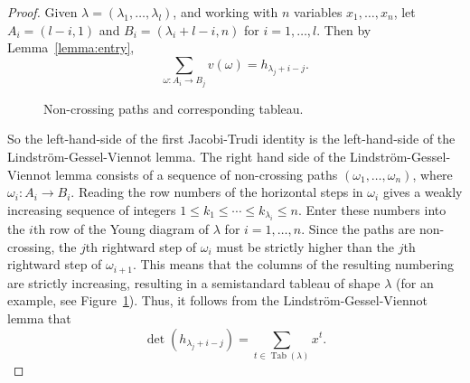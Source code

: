 \documentclass[11pt]{amsproc}
\theoremstyle{definition}
\theoremstyle{example}
\DeclareMathOperator{\tab}{Tab}
\begin{document}
\begin{proof}
  Given $\lambda=(\lambda_1,\dotsc,\lambda_l)$, and working with $n$ variables $x_1,\dotsc,x_n$, let $A_i = (l-i, 1)$ and $B_i=(\lambda_i+l-i, n)$ for $i=1,\dotsc, l$.
  Then  by Lemma~\ref{lemma:entry},
  \begin{displaymath}
    \sum_{\omega:A_i\to B_j} v(\omega) = h_{\lambda_j+i-j}.
  \end{displaymath}
  \begin{figure}
    \centering
    \hspace{1cm}
    \caption{Non-crossing paths and corresponding tableau.}
    \label{fig:jacobi-trudi}
  \end{figure}
  So the left-hand-side of the first Jacobi-Trudi identity is the left-hand-side of the Lindstr\"om-Gessel-Viennot lemma.
  The right hand side of the Lindstr\"om-Gessel-Viennot lemma consists of a sequence of non-crossing paths $(\omega_1,\dotsc,\omega_n)$, where $\omega_i:A_i\to B_i$.
  Reading the row numbers of the horizontal steps in $\omega_i$ gives a weakly increasing sequence of integers $1\leq k_1 \leq \dotsb \leq k_{\lambda_i}\leq n$.
  Enter these numbers into the $i$th row of the Young diagram of $\lambda$ for $i=1,\dotsc,n$.
  Since the paths are non-crossing, the $j$th rightward step of $\omega_i$ must be strictly higher than the $j$th rightward step of $\omega_{i+1}$.
  This means that the columns of the resulting numbering are strictly increasing, resulting in a semistandard tableau of shape $\lambda$ (for an example, see Figure~\ref{fig:jacobi-trudi}).
  Thus, it follows from the Lindstr\"om-Gessel-Viennot lemma that
  \begin{displaymath}
    \det(h_{\lambda_j+i-j}) = \sum_{t\in \tab(\lambda)} x^t.
  \end{displaymath}


\end{proof}
\end{document}
